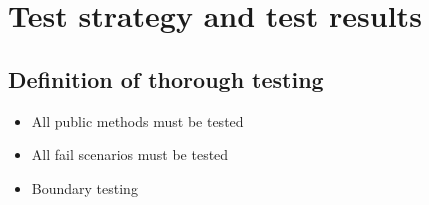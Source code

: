 \section{Test strategy and test results}
\subsection{Definition of thorough testing}
\begin{itemize}
  \item All public methods must be tested
  \item All fail scenarios must be tested
  \item Boundary testing
\end{itemize}

\newpage